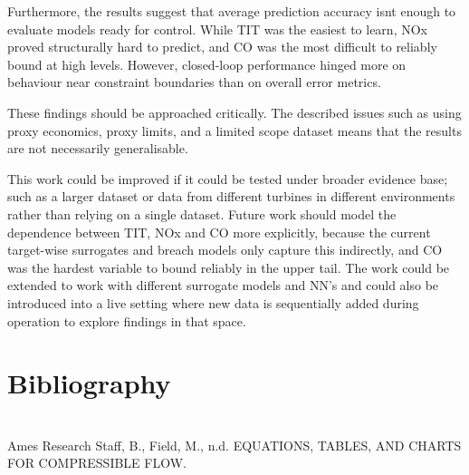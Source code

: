 \documentclass[11pt]{article}
\begin{document}
Furthermore, the results suggest that average prediction accuracy
isn\textquotesingle t enough to evaluate models ready for control. While
TIT was the easiest to learn, NOx proved structurally hard to predict,
and CO was the most difficult to reliably bound at high levels. However,
closed-loop performance hinged more on behaviour near constraint
boundaries than on overall error metrics.

These findings should be approached critically. The described issues
such as using proxy economics, proxy limits, and a limited scope dataset
means that the results are not necessarily generalisable.

This work could be improved if it could be tested under broader evidence
base; such as a larger dataset or data from different turbines in
different environments rather than relying on a single dataset. Future
work should model the dependence between TIT, NOx and CO more
explicitly, because the current target-wise surrogates and breach models
only capture this indirectly, and CO was the hardest variable to bound
reliably in the upper tail. The work could be extended to work with
different surrogate models and NN's and could also be introduced into a
live setting where new data is sequentially added during operation to
explore findings in that space.

\section{Bibliography}\label{bibliography}

\section{}\label{section-16}

Ames Research Staff, B., Field, M., n.d. EQUATIONS, TABLES, AND CHARTS
FOR COMPRESSIBLE FLOW.
\end{document}
